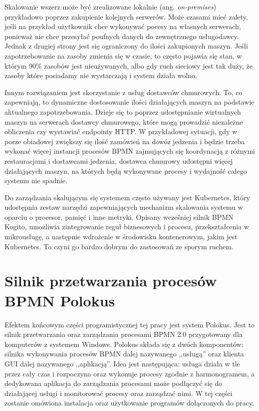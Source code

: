 \documentclass[declaration,shortabstract,mgr]{iithesis}
\newcommand{\bpmn}{BPMN }
\begin{document}
Skalowanie wszerz może być zrealizowane lokalnie (ang. \textit{on-premises}) przykładowo poprzez zakupienie kolejnych serwerów. Może czasami mieć zalety, jeśli na przykład użytkownik chce wykonywać pocesy na własnych serwerach, ponieważ nie chce przesyłać poufnych danych do zewnętrznego usługodawcy. Jednak z drugiej strony jest się ograniczony do ilości zakupionych maszyn. Jeśli zapotrzebowanie na zasoby zmienia się w czasie, to często pojawia się stan, w którym 90\% zasobów jest nieużywanych, albo gdy ruch sieciowy jest tak duży, że zasoby które posiadamy nie wystarczają i system działa wolno.

Innym rozwiązaniem jest skorzystanie z usług dostawców chmurowych. To, co zapewniają, to dynamiczne dostosowanie ilości działających maszyn na podstawie aktualnego zapotrzebowania. Dzieje się to poprzez udostępnianie wirtualnych maszyn na serwerach dostawcy chmurowego, które mogą prowadzić niezależne obliczenia czy wystawiać endpointy HTTP. W przykładowej sytuacji, gdy w porze obiadowej zwiększy się ilość zamówień na dowóz jedzenia i będzie trzeba wykonać więcej instancji procesów \bpmn zajmujących się koordynacją z różnymi restauracjami i dostawcami jedzenia, dostawca chmurowy udostępni więcej działających maszyn, na których będą wykonywane procesy i wydajność całego systemu nie spadnie.

Do zarządzania skalującym się systemem często używany jest Kubernetes, który udostępnia zestaw narzędzi zapewniających mechanizm skalowania systemu w oparciu o procesor, pamięć i inne metryki. Opisany wcześniej silnik \bpmn Kogito, umożliwia zintegrowanie reguł biznesowych i procesu, przekształcenia w mikrousługę, a następnie wdrożenie w środowisku kontenerowym, jakim jest Kubernetes. To czyni go bardzo dobrym do zastosowań ze sporym ruchem.


\chapter{Silnik przetwarzania procesów BPMN Polokus}\label{chapter-polokus}

Efektem końcowym części programistycznej tej pracy jest system Polokus. Jest to silnik przetwarzania oraz zarządzania procesami \bpmn 2.0 przygotowany dla komputerów z systemem Windows. Polokus składa się z dwóch komponentów: silnika wykonywania procesów \bpmn dalej nazywanego ,,usługą'' oraz klienta GUI dalej nazywanego ,,aplikacją''. Idea jest następująca: usługa działa w tle przez cały czas i rozpoczyna oraz wykonuje procesy zgodnie z harmonogramem, a dedykowana aplikacja do zarządzania procesami może podłączyć się do działającej usługi i monitorować procesy oraz zarządzać nimi. W tej części zostanie omówiona instalacja oraz użytkowanie programów dołączonych do pracy.
\end{document}
